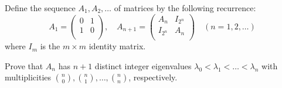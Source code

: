 Define the sequence $A_1,A_2,\ldots$ of matrices by the following recurrence: $$ A_1 = \begin{pmatrix} 0 & 1 \\ 1 & 0 \\ \end{pmatrix}, \quad A_{n+1} = \begin{pmatrix} A_n & I_{2^n} \\ I_{2^n} & A_n \\ \end{pmatrix} \quad (n=1,2,\ldots) $$where $I_m$ is the $m\times m$ identity matrix.

Prove that $A_n$ has $n+1$ distinct integer eigenvalues $\lambda_0< \lambda_1<\ldots <\lambda_n$ with multiplicities $\binom{n}{0},\binom{n}{1},\ldots,\binom{n}{n}$, respectively.